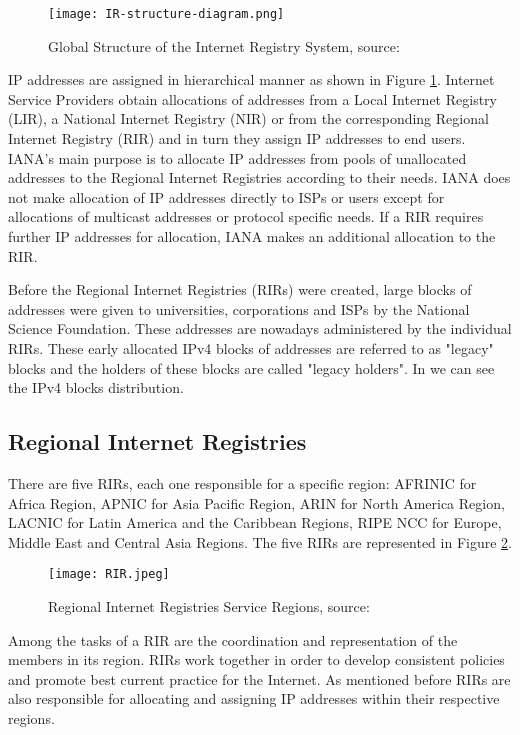 \documentclass[11pt,a4paper]{scrreprt}
\begin{document}
\begin{figure}[!h]
\centering
\texttt{[image: IR-structure-diagram.png]}
\caption{Global Structure of the Internet Registry System, source:\cite{FIG_GLOBAL_IRS}}
\label{fig:ir_structure_diagram}
\end{figure}

IP addresses are assigned in hierarchical manner as shown in Figure \ref{fig:ir_structure_diagram}. Internet Service Providers obtain allocations of addresses from a Local Internet Registry (LIR), a National Internet Registry (NIR) or from the corresponding Regional Internet Registry (RIR) and in turn they assign IP addresses to end users. IANA's main purpose is to allocate IP addresses from pools of unallocated addresses to the Regional Internet Registries according to their needs. IANA does not make allocation of IP addresses directly to ISPs or users except for allocations of multicast addresses or protocol specific needs. If a RIR requires further IP addresses for allocation, IANA makes an additional allocation to the RIR. 

Before the Regional Internet Registries (RIRs) were created, large blocks of addresses were given to universities, corporations and ISPs by the National Science Foundation. These addresses are nowadays administered by the individual RIRs. These early allocated IPv4 blocks of addresses are referred to as "legacy" blocks and the holders of these blocks are called "legacy holders". In \cite{IANA_Address_Space} we can see the IPv4 blocks distribution.


\subsection{Regional Internet Registries}

There are five RIRs, each one responsible for a specific region: AFRINIC for Africa Region, APNIC for Asia Pacific Region, ARIN for North America Region, LACNIC for Latin America and the Caribbean Regions, RIPE NCC for Europe, Middle East and Central Asia Regions. The five RIRs are represented in Figure \ref{fig:rirs_image}.

\begin{figure}[!h]
\centering
\texttt{[image: RIR.jpeg]}
\caption{Regional Internet Registries Service Regions, source:\cite{FIG_GLOBAL_IRS}}
\label{fig:rirs_image}
\end{figure}

Among the tasks of a RIR are the coordination and representation of the members in its region. RIRs work together in order to develop consistent policies and promote best current practice for the Internet. As mentioned before RIRs are also responsible for allocating and assigning IP addresses within their respective regions. 
\end{document}

